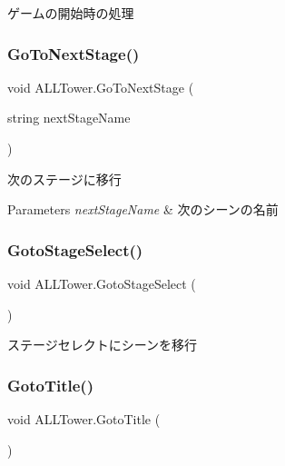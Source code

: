 ゲームの開始時の処理 

\mbox{\label{class_a_l_l_tower_a02ad7d49b43a0d3466fe7aecc099bd4b}} 
\subsubsection{\texorpdfstring{Go\+To\+Next\+Stage()}{GoToNextStage()}}
{\footnotesize\ttfamily void A\+L\+L\+Tower.\+Go\+To\+Next\+Stage (\begin{DoxyParamCaption}\item[{string}]{next\+Stage\+Name }\end{DoxyParamCaption})\hspace{0.3cm}{\ttfamily [inline]}}



次のステージに移行 


\begin{DoxyParams}{Parameters}
{\em next\+Stage\+Name} & 次のシーンの名前\\
\hline
\end{DoxyParams}
\mbox{\label{class_a_l_l_tower_a75b8b5715175131c28e9e1a571e57521}} 
\subsubsection{\texorpdfstring{Goto\+Stage\+Select()}{GotoStageSelect()}}
{\footnotesize\ttfamily void A\+L\+L\+Tower.\+Goto\+Stage\+Select (\begin{DoxyParamCaption}{ }\end{DoxyParamCaption})\hspace{0.3cm}{\ttfamily [inline]}}



ステージセレクトにシーンを移行 

\mbox{\label{class_a_l_l_tower_a4ace44a9bb3967b4f8f7b534e5e2df40}} 
\subsubsection{\texorpdfstring{Goto\+Title()}{GotoTitle()}}
{\footnotesize\ttfamily void A\+L\+L\+Tower.\+Goto\+Title (\begin{DoxyParamCaption}{ }\end{DoxyParamCaption})\hspace{0.3cm}{\ttfamily [inline]}}




